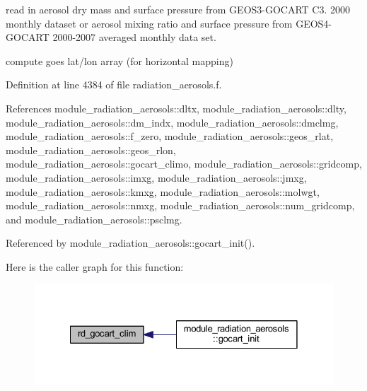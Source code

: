 \begin{DoxyEnumerate}
\item read in aerosol dry mass and surface pressure from G\+E\+O\+S3-\/\+G\+O\+C\+A\+RT C3. 2000 monthly dataset or aerosol mixing ratio and surface pressure from G\+E\+O\+S4-\/\+G\+O\+C\+A\+RT 2000-\/2007 averaged monthly data set.
\item compute goes lat/lon array (for horizontal mapping) 
\end{DoxyEnumerate}

Definition at line 4384 of file radiation\+\_\+aerosols.\+f.



References module\+\_\+radiation\+\_\+aerosols\+::dltx, module\+\_\+radiation\+\_\+aerosols\+::dlty, module\+\_\+radiation\+\_\+aerosols\+::dm\+\_\+indx, module\+\_\+radiation\+\_\+aerosols\+::dmclmg, module\+\_\+radiation\+\_\+aerosols\+::f\+\_\+zero, module\+\_\+radiation\+\_\+aerosols\+::geos\+\_\+rlat, module\+\_\+radiation\+\_\+aerosols\+::geos\+\_\+rlon, module\+\_\+radiation\+\_\+aerosols\+::gocart\+\_\+climo, module\+\_\+radiation\+\_\+aerosols\+::gridcomp, module\+\_\+radiation\+\_\+aerosols\+::imxg, module\+\_\+radiation\+\_\+aerosols\+::jmxg, module\+\_\+radiation\+\_\+aerosols\+::kmxg, module\+\_\+radiation\+\_\+aerosols\+::molwgt, module\+\_\+radiation\+\_\+aerosols\+::nmxg, module\+\_\+radiation\+\_\+aerosols\+::num\+\_\+gridcomp, and module\+\_\+radiation\+\_\+aerosols\+::psclmg.



Referenced by module\+\_\+radiation\+\_\+aerosols\+::gocart\+\_\+init().



Here is the caller graph for this function\+:\nopagebreak
\begin{figure}[H]
\begin{center}
\leavevmode
\includegraphics[width=328pt]{radiation__aerosols_8f_a15bad8499ffd17d967e5788cd6721c4d_icgraph}
\end{center}
\end{figure}


